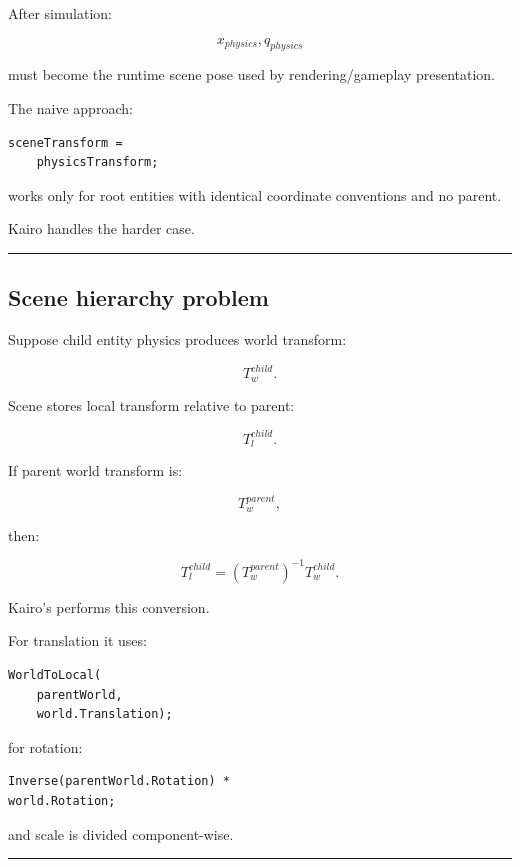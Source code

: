 After simulation:

\[
x_{physics},q_{physics}
\]

must become the runtime scene pose used by rendering/gameplay presentation.

The naive approach:

\begin{verbatim}
sceneTransform =
    physicsTransform;
\end{verbatim}

works only for root entities with identical coordinate conventions and no parent.

Kairo handles the harder case.

\begin{center}\rule{0.5\linewidth}{0.5pt}\end{center}

\subsection{Scene hierarchy problem}\label{06-engine-ii-ch037-scene-hierarchy-problem}

\hypertarget{06-engine-ii-ch037-scene-hierarchy-problem}{}

Suppose child entity physics produces world transform:

\[
T_w^{child}.
\]

Scene stores local transform relative to parent:

\[
T_l^{child}.
\]

If parent world transform is:

\[
T_w^{parent},
\]

then:

\[
\boxed{
T_l^{child}
=
(T_w^{parent})^{-1}
T_w^{child}.
}
\]

Kairo's  performs this conversion.

For translation it uses:

\begin{verbatim}
WorldToLocal(
    parentWorld,
    world.Translation);
\end{verbatim}

for rotation:

\begin{verbatim}
Inverse(parentWorld.Rotation) *
world.Rotation;
\end{verbatim}

and scale is divided component-wise.

\begin{center}\rule{0.5\linewidth}{0.5pt}\end{center}

